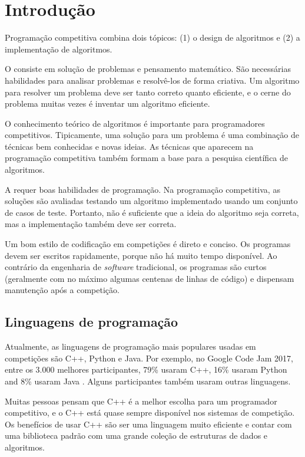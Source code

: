 \chapter{Introdução}

Programação competitiva combina dois tópicos:
(1) o design de algoritmos e (2) a implementação de algoritmos.

O  consiste em solução de problemas
e pensamento matemático.
São necessárias habilidades para analisar problemas e resolvê-los de forma criativa.
Um algoritmo para resolver um problema deve ser tanto correto quanto eficiente, e o cerne do problema muitas vezes é inventar um algoritmo eficiente.

O conhecimento teórico de algoritmos é importante para programadores competitivos. Tipicamente, uma solução para um problema é uma combinação de técnicas bem conhecidas e novas ideias. As técnicas que aparecem na programação competitiva também formam a base para a pesquisa científica de algoritmos.

A  requer boas habilidades de programação. Na programação competitiva, as soluções são avaliadas testando um algoritmo implementado usando um conjunto de casos de teste. Portanto, não é suficiente que a ideia do algoritmo seja correta, mas a implementação também deve ser correta.

Um bom estilo de codificação em competições é direto e conciso. Os programas devem ser escritos rapidamente, porque não há muito tempo disponível. Ao contrário da engenharia de \emph{software} tradicional, os programas são curtos (geralmente com no máximo algumas centenas de linhas de código) e dispensam manutenção após a competição.

\section{Linguagens de programação}


Atualmente, as linguagens de programação mais populares usadas em competições são C++, Python e Java.
 Por exemplo, no Google Code Jam 2017,
 entre os 3.000 melhores participantes,
79\% usaram C++,
16\% usaram Python and
8\% usaram Java \cite{goo17}.
Alguns participantes também usaram outras linguagens.

Muitas pessoas pensam que C++ é a melhor escolha para um programador competitivo, e o C++ está quase sempre disponível nos sistemas de competição. Os benefícios de usar C++ são ser uma linguagem muito eficiente e contar com uma biblioteca padrão com uma grande coleção de estruturas de dados e algoritmos.

